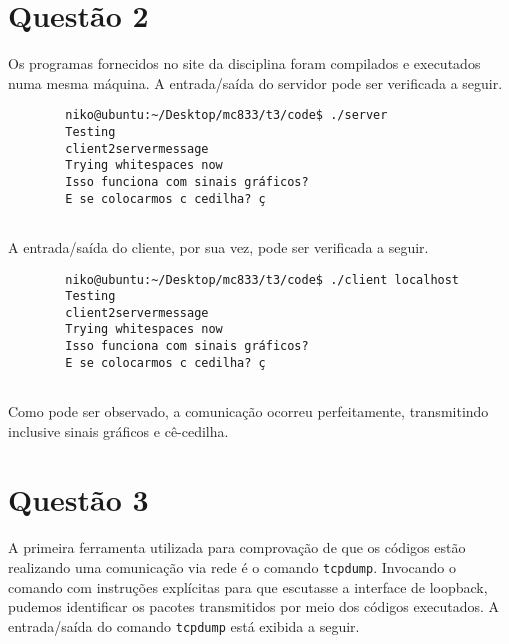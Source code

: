 \documentclass[a4paper,10pt]{article}
\begin{document}
\section{Questão 2}
    Os programas fornecidos no site da disciplina foram compilados e executados numa mesma máquina. A entrada/saída do servidor pode ser verificada a seguir.
    
    \begin{lstlisting}
        niko@ubuntu:~/Desktop/mc833/t3/code$ ./server
        Testing
        client2servermessage
        Trying whitespaces now
        Isso funciona com sinais gráficos?
        E se colocarmos c cedilha? ç
    
    \end{lstlisting}
    
    A entrada/saída do cliente, por sua vez, pode ser verificada a seguir.
    
    \begin{lstlisting}
        niko@ubuntu:~/Desktop/mc833/t3/code$ ./client localhost
        Testing
        client2servermessage   
        Trying whitespaces now
        Isso funciona com sinais gráficos?
        E se colocarmos c cedilha? ç
    
    \end{lstlisting}
    
    Como pode ser observado, a comunicação ocorreu perfeitamente, transmitindo inclusive sinais gráficos e cê-cedilha.

\section{Questão 3}
    A primeira ferramenta utilizada para comprovação de que os códigos estão realizando uma comunicação via rede é o comando {\tt tcpdump}. Invocando o comando com instruções explícitas para que escutasse a interface de loopback, pudemos identificar os pacotes transmitidos por meio dos códigos executados. A entrada/saída do comando {\tt tcpdump} está exibida a seguir.
    
\end{document}

